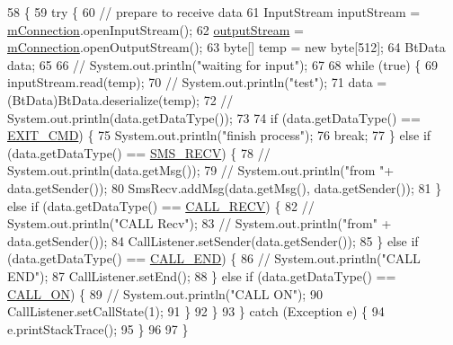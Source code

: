 \begin{DoxyCode}
58                     \{
59     \textcolor{keywordflow}{try} \{
60       \textcolor{comment}{// prepare to receive data}
61       InputStream inputStream = \hyperlink{classkr_1_1ac_1_1kookmin_1_1cs_1_1bluetooth_1_1_process_connection_thread_a3279e43af243928d3eafa90238198fc1}{mConnection}.openInputStream();
62       \hyperlink{classkr_1_1ac_1_1kookmin_1_1cs_1_1bluetooth_1_1_process_connection_thread_ab283f9949cd2d643769616474eecba8c}{outputStream} = \hyperlink{classkr_1_1ac_1_1kookmin_1_1cs_1_1bluetooth_1_1_process_connection_thread_a3279e43af243928d3eafa90238198fc1}{mConnection}.openOutputStream();
63       byte[] temp = \textcolor{keyword}{new} byte[512];
64       BtData data;
65 
66 \textcolor{comment}{//      System.out.println("waiting for input");}
67 
68       \textcolor{keywordflow}{while} (\textcolor{keyword}{true}) \{
69         inputStream.read(temp);
70 \textcolor{comment}{//        System.out.println("test");}
71         data =(BtData)BtData.deserialize(temp);
72 \textcolor{comment}{//        System.out.println(data.getDataType());}
73 
74         \textcolor{keywordflow}{if} (data.getDataType() == \hyperlink{classkr_1_1ac_1_1kookmin_1_1cs_1_1bluetooth_1_1_process_connection_thread_a9b1ebd6964ca0131244012f911344bc7}{EXIT\_CMD}) \{   
75           System.out.println(\textcolor{stringliteral}{"finish process"});
76           \textcolor{keywordflow}{break};
77         \} \textcolor{keywordflow}{else} \textcolor{keywordflow}{if} (data.getDataType() == \hyperlink{classkr_1_1ac_1_1kookmin_1_1cs_1_1bluetooth_1_1_process_connection_thread_ad4414914d0f4597985a7d5d9a393dbe8}{SMS\_RECV}) \{
78 \textcolor{comment}{//          System.out.println(data.getMsg());}
79 \textcolor{comment}{//          System.out.println("from "+ data.getSender());}
80           SmsRecv.addMsg(data.getMsg(), data.getSender());
81         \} \textcolor{keywordflow}{else} \textcolor{keywordflow}{if} (data.getDataType() == \hyperlink{classkr_1_1ac_1_1kookmin_1_1cs_1_1bluetooth_1_1_process_connection_thread_a0548e2796fc397b9e2200ece09ddaf85}{CALL\_RECV}) \{
82 \textcolor{comment}{//          System.out.println("CALL Recv");}
83 \textcolor{comment}{//          System.out.println("from" + data.getSender());}
84           CallListener.setSender(data.getSender());
85         \} \textcolor{keywordflow}{else} \textcolor{keywordflow}{if} (data.getDataType() == \hyperlink{classkr_1_1ac_1_1kookmin_1_1cs_1_1bluetooth_1_1_process_connection_thread_aa6652de5543b447becf5038350c347db}{CALL\_END}) \{
86 \textcolor{comment}{//          System.out.println("CALL END");}
87           CallListener.setEnd();
88         \} \textcolor{keywordflow}{else} \textcolor{keywordflow}{if} (data.getDataType() == \hyperlink{classkr_1_1ac_1_1kookmin_1_1cs_1_1bluetooth_1_1_process_connection_thread_ac05e580f8a5d910bb6803edd7680f6ce}{CALL\_ON}) \{
89 \textcolor{comment}{//          System.out.println("CALL ON");}
90           CallListener.setCallState(1);
91         \}
92       \}
93     \} \textcolor{keywordflow}{catch} (Exception e) \{
94       e.printStackTrace();
95     \} 
96 
97   \}
\end{DoxyCode}


